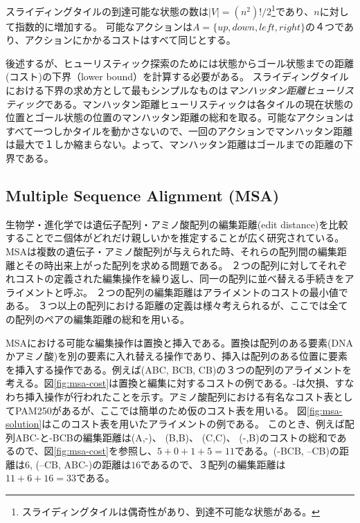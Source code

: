 \documentclass{report}
\begin{document}
スライディングタイルの到達可能な状態の数は$|V| = (n^2)!/2$\footnote{スライディングタイルは偶奇性があり、到達不可能な状態がある\cite{TODO}。}であり、$n$に対して指数的に増加する。
可能なアクションは$A= \{up, down, left, right\}$の４つであり、アクションにかかるコストはすべて同じとする。

後述するが、ヒューリスティック探索のためには状態からゴール状態までの距離(コスト)の下界（lower bound）を計算する必要がある。
スライディングタイルにおける下界の求め方として最もシンプルなものは{\it マンハッタン距離ヒューリスティック}である。マンハッタン距離ヒューリスティックは各タイルの現在状態の位置とゴール状態の位置のマンハッタン距離の総和を取る。可能なアクションはすべて一つしかタイルを動かさないので、一回のアクションでマンハッタン距離は最大で１しか縮まらない。よって、マンハッタン距離はゴールまでの距離の下界である。


\subsection{Multiple Sequence Alignment (MSA)}

生物学・進化学では遺伝子配列・アミノ酸配列の編集距離(edit distance)を比較することでニ個体がどれだけ親しいかを推定することが広く研究されている。
MSAは複数の遺伝子・アミノ酸配列が与えられた時、それらの配列間の編集距離とその時出来上がった配列を求める問題である。
２つの配列に対してそれぞれコストの定義された編集操作を繰り返し、同一の配列に並べ替える手続きをアライメントと呼ぶ。
２つの配列の編集距離はアライメントのコストの最小値である。
３つ以上の配列における距離の定義は様々考えられるが、ここでは全ての配列のペアの編集距離の総和を用いる。

MSAにおける可能な編集操作は置換と挿入である。置換は配列のある要素(DNAかアミノ酸)を別の要素に入れ替える操作であり、挿入は配列のある位置に要素を挿入する操作である。例えば(ABC, BCB, CB)の３つの配列のアライメントを考える。図\ref{fig:msa-cost}は置換と編集に対するコストの例である。-は欠損、すなわち挿入操作が行われたことを示す。アミノ酸配列における有名なコスト表としてPAM250があるが、ここでは簡単のため仮のコスト表を用いる\cite{MSA}。
図\ref{fig:msa-solution}はこのコスト表を用いたアライメントの例である。
このとき、例えば配列ABC-と-BCBの編集距離は(A,-)、 (B,B)、 (C,C)、 (-,B)のコストの総和であるので、図\ref{fig:msa-cost}を参照し、$5+0+1+5=11$である。(-BCB, --CB)の距離は$6$, (--CB, ABC-)の距離は$16$であるので、３配列の編集距離は$11+6+16=33$である。
\end{document}
